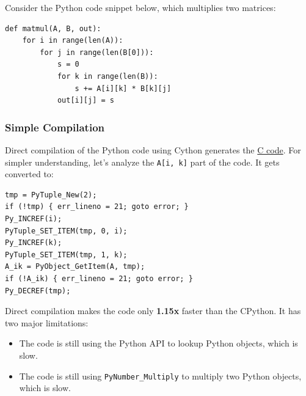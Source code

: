 \documentclass[11pt,paper=a4,answers]{exam}
\begin{document}
Consider the Python code snippet below, which multiplies two matrices:
\begin{lstlisting}[style=pythonStyle]
def matmul(A, B, out):
    for i in range(len(A)):
        for j in range(len(B[0])):
            s = 0
            for k in range(len(B)):
                s += A[i][k] * B[k][j]
            out[i][j] = s
\end{lstlisting}

\subsubsection{Simple Compilation}
Direct compilation of the Python code using Cython generates the \href{https://pastebin.com/CeV1ZBxS}{C code}. For simpler understanding, let's analyze the \texttt{A[i, k]} part of the code. It gets converted to:
\begin{lstlisting}[style=cStyle]
tmp = PyTuple_New(2);
if (!tmp) { err_lineno = 21; goto error; }
Py_INCREF(i);
PyTuple_SET_ITEM(tmp, 0, i);
Py_INCREF(k);
PyTuple_SET_ITEM(tmp, 1, k);
A_ik = PyObject_GetItem(A, tmp);
if (!A_ik) { err_lineno = 21; goto error; }
Py_DECREF(tmp);
\end{lstlisting}    
Direct compilation makes the code only \textbf{1.15x} faster than the CPython. It has two major limitations:
\begin{itemize}
    \item The code is still using the Python API to lookup Python objects, which is slow.
    \item The code is still using \texttt{PyNumber\_Multiply} to multiply two Python objects, which is slow.
\end{itemize}
\end{document}
